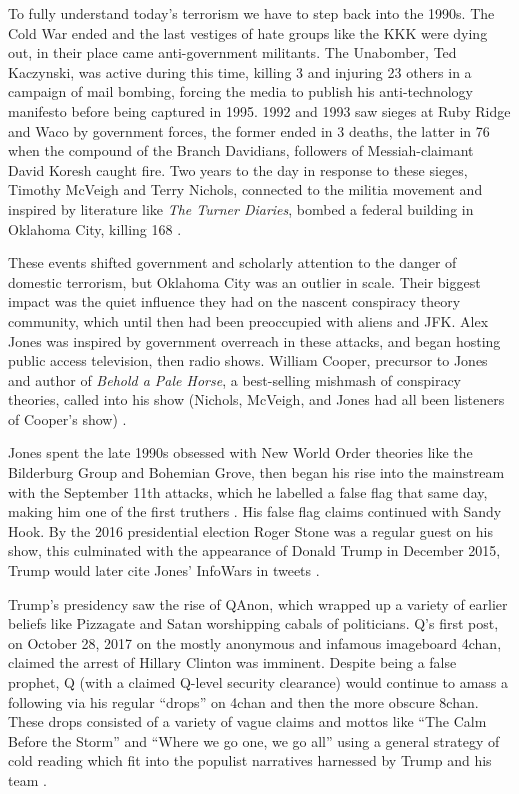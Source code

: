 To fully understand today's terrorism we have to step back into the 1990s.
The Cold War ended and the last vestiges of hate groups like the KKK were dying out, in their place came anti-government militants.
The Unabomber, Ted Kaczynski, was active during this time, killing 3 and injuring 23 others in a campaign of mail bombing, forcing the media to publish his anti-technology manifesto before being captured in 1995.
1992 and 1993 saw sieges at Ruby Ridge and Waco by government forces, the former ended in 3 deaths, the latter in 76 when the compound of the Branch Davidians, followers of Messiah-claimant David Koresh caught fire.
Two years to the day in response to these sieges, Timothy McVeigh and Terry Nichols, connected to the militia movement and inspired by literature like \emph{The Turner Diaries}, bombed a federal building in Oklahoma City, killing 168 \cite{ling2021}.

These events shifted government and scholarly attention to the danger of domestic terrorism, but Oklahoma City was an outlier in scale. 
Their biggest impact was the quiet influence they had on the nascent conspiracy theory community, which until then had been preoccupied with aliens and JFK.
Alex Jones was inspired by government overreach in these attacks, and began hosting public access television, then radio shows.
William Cooper, precursor to Jones and author of \emph{Behold a Pale Horse}, a best-selling mishmash of conspiracy theories, called into his show (Nichols, McVeigh, and Jones had all been listeners of Cooper's show) \cite{ling2021}. 

Jones spent the late 1990s obsessed with New World Order theories like the Bilderburg Group and Bohemian Grove, then began his rise into the mainstream with the September 11th attacks, which he labelled a false flag that same day, making him one of the first truthers \cite{ling2021}.
His false flag claims continued with Sandy Hook.
By the 2016 presidential election Roger Stone was a regular guest on his show, this culminated with the appearance of Donald Trump in December 2015, Trump would later cite Jones' InfoWars in tweets \cite{finnegan2016}.

Trump's presidency saw the rise of QAnon, which wrapped up a variety of earlier beliefs like Pizzagate and Satan worshipping cabals of politicians.
Q's first post, on October 28, 2017 on the mostly anonymous and infamous imageboard 4chan, claimed the arrest of Hillary Clinton was imminent.
Despite being a false prophet, Q (with a claimed Q-level security clearance) would continue to amass a following via his regular ``drops'' on 4chan and then the more obscure 8chan.
These drops consisted of a variety of vague claims and mottos like ``The Calm Before the Storm'' and ``Where we go one, we go all'' using a general strategy of cold reading which fit into the populist narratives harnessed by Trump and his team \cite{amarasingam2020}.

